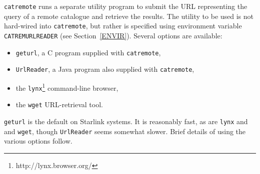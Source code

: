 \documentclass[twoside,11pt]{article}
\newcommand{\htmladdnormallinkfoot}[2]{#1\footnote{#2}}
\renewcommand{\_}{\texttt{\symbol{95}}}
\begin{document}
{\tt catremote} runs a separate utility program to submit the URL
representing the query of a remote catalogue and retrieve the results.
The utility to be used is not hard-wired into {\tt catremote}, but rather
is specified using environment variable {\tt CATREM\_URLREADER} (see
Section~\ref{ENVIR}).  Several options are available:

\begin{itemize}

  \item {\tt geturl}, a C program supplied with {\tt catremote},

  \item {\tt UrlReader}, a Java program also supplied with {\tt catremote},

  \item the \htmladdnormallinkfoot{{\tt lynx}}{http://lynx.browser.org/}
   command-line browser,

  \item the {\tt wget} URL-retrieval tool.

\end{itemize}

{\tt geturl} is the default on Starlink systems.  It is reasonably fast, as
are {\tt lynx} and and {\tt wget}, though {\tt UrlReader} seems somewhat
slower.  Brief details of using the various options follow.
\end{document}
